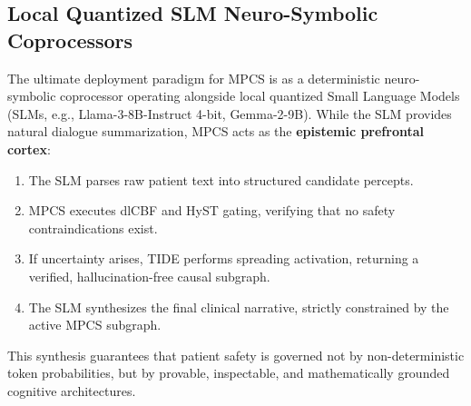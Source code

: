 \documentclass[10pt,twocolumn,letterpaper]{article}
\begin{document}
\subsection{Local Quantized SLM Neuro-Symbolic Coprocessors}
The ultimate deployment paradigm for MPCS is as a deterministic neuro-symbolic coprocessor operating alongside local quantized Small Language Models (SLMs, e.g., Llama-3-8B-Instruct 4-bit, Gemma-2-9B). While the SLM provides natural dialogue summarization, MPCS acts as the \textbf{epistemic prefrontal cortex}:
\begin{enumerate}
  \item The SLM parses raw patient text into structured candidate percepts.
  \item MPCS executes dlCBF and HyST gating, verifying that no safety contraindications exist.
  \item If uncertainty arises, TIDE performs spreading activation, returning a verified, hallucination-free causal subgraph.
  \item The SLM synthesizes the final clinical narrative, strictly constrained by the active MPCS subgraph.
\end{enumerate}
This synthesis guarantees that patient safety is governed not by non-deterministic token probabilities, but by provable, inspectable, and mathematically grounded cognitive architectures.
\end{document}
